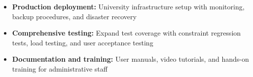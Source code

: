 \documentclass[12pt,a4paper]{report}
\begin{document}
\begin{itemize}
    \item \textbf{Production deployment:} University infrastructure setup with monitoring, backup procedures, and disaster recovery
    
    \item \textbf{Comprehensive testing:} Expand test coverage with constraint regression tests, load testing, and user acceptance testing
    
    \item \textbf{Documentation and training:} User manuals, video tutorials, and hands-on training for administrative staff
\end{itemize}




\end{document}
